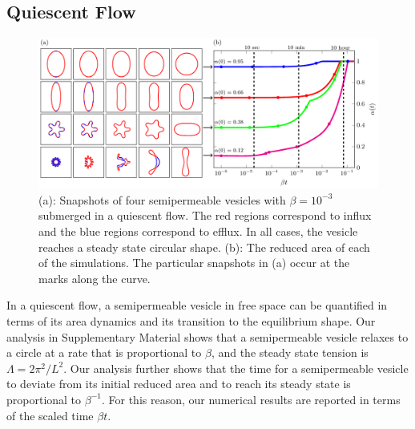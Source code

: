 \documentclass[9pt,twocolumn,twoside,lineno]{pnas-new}
\newif\ifTikz
\begin{document}
\subsection*{Quiescent Flow} 
\begin{figure}[htp]
  \centering
  \ifTikz
  
  \else
  \includegraphics{figures/relaxationComposite.pdf}
  \fi
  \caption{\label{fig:relaxationComposite} (a): Snapshots of four
  semipermeable vesicles with $\beta = 10^{-3}$ submerged in a quiescent
  flow. The red regions correspond to influx and the blue regions
  correspond to efflux. In all cases, the vesicle reaches a steady state
  circular shape. (b): The reduced area of each of the simulations. The
  particular snapshots in (a) occur at the marks along the curve.}
\end{figure}
In a quiescent flow, a semipermeable vesicle in free space can be
quantified in terms of its area dynamics and its transition to the
equilibrium shape. Our analysis in Supplementary Material shows that a
semipermeable vesicle relaxes to a circle at a rate that is proportional
to $\beta$, and the steady state tension is $\Lambda = 2\pi^2/L^2$. Our
analysis further shows that the time for a semipermeable vesicle to
deviate from its initial reduced area and to reach its steady state is
proportional to $\beta^{-1}$. For this reason, our numerical results are
reported in terms of the scaled time $\beta t$.
\end{document}

